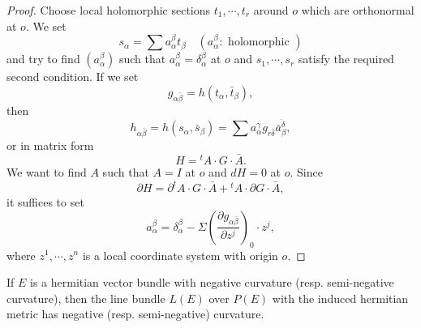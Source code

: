 \documentclass[lang=en,12pt]{beautybook}
\begin{document}
\begin{proof}
Choose local holomorphic sections $t_1, \cdots, t_r$ around $o$ which are orthonormal at $o$. We set
\begin{equation*}
s_\alpha=\sum a_\alpha^\beta t_\beta \quad (a_\alpha^\beta: \text { holomorphic })
\end{equation*}
and try to find $\left(a_\alpha^\beta\right)$ such that $a_\alpha^\beta=\delta_\alpha^\beta$ at $o$ and $s_1, \cdots, s_r$ satisfy the required second condition. If we set
\begin{equation*}
g_{\alpha \bar{\beta}}=h\left(t_\alpha, \bar{t}_\beta\right),
\end{equation*}
then
\begin{equation*}
h_{\alpha \bar{\beta}}=h\left(s_\alpha, \bar{s}_\beta\right)=\sum a_\alpha^\gamma g_{r \bar{\delta}} \bar{a}_\beta^{\grave{\delta}},
\end{equation*}
or in matrix form
\begin{equation*}
H={ }^t A \cdot G \cdot \bar{A} .
\end{equation*}
We want to find $A$ such that $A=I$ at $o$ and $d H=0$ at $o$. Since
\begin{equation*}
\partial H=\partial^t A \cdot G \cdot \bar{A}+{ }^t A \cdot \partial G \cdot \bar{A},
\end{equation*}
it suffices to set
\begin{equation*}
a_\alpha^\beta=\delta_\alpha^\beta-\Sigma\left(\frac{\partial g_{\alpha \bar{\beta}}}{\partial z^j}\right)_0 \cdot z^j,
\end{equation*}
where $z^1, \cdots, z^n$ is a local coordinate system with origin $o$.
\end{proof}

\begin{proposition}
If $E$ is a hermitian vector bundle with negative curvature (resp. semi-negative curvature), then the line bundle $L(E)$ over $P(E)$ with the induced hermitian metric has negative (resp. semi-negative) curvature.
\end{proposition}
\end{document}
